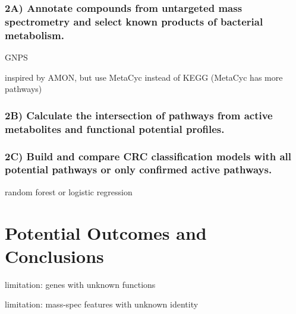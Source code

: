 \documentclass[11pt]{article}
\begin{document}
\subsubsection*{2A) Annotate compounds from untargeted mass spectrometry and select known products of bacterial metabolism.}

GNPS

inspired by AMON, but use MetaCyc instead of KEGG (MetaCyc has more pathways)

\subsubsection*{2B) Calculate the intersection of pathways from active metabolites and functional potential profiles.}

\subsubsection*{2C) Build and compare CRC classification models with all potential pathways or only confirmed active pathways.}

random forest or logistic regression

\section*{Potential Outcomes and Conclusions}

limitation: genes with unknown functions

limitation: mass-spec features with unknown identity

\pagebreak
\footnotesize{

\par}
\end{document}
